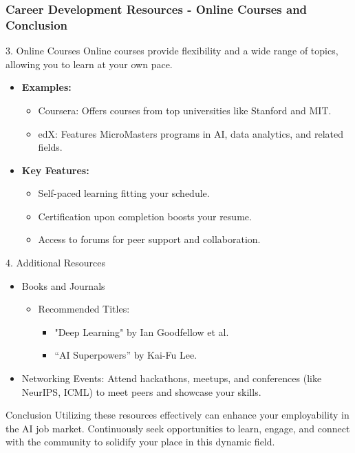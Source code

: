\documentclass{beamer}
\begin{document}
\begin{frame}[fragile]
    \frametitle{Career Development Resources - Online Courses and Conclusion}
    \begin{block}{3. Online Courses}
        Online courses provide flexibility and a wide range of topics, allowing you to learn at your own pace.
    \end{block}
    \begin{itemize}
        \item \textbf{Examples:}
        \begin{itemize}
            \item Coursera: Offers courses from top universities like Stanford and MIT.
            \item edX: Features MicroMasters programs in AI, data analytics, and related fields.
        \end{itemize}
        
        \item \textbf{Key Features:}
        \begin{itemize}
            \item Self-paced learning fitting your schedule.
            \item Certification upon completion boosts your resume.
            \item Access to forums for peer support and collaboration.
        \end{itemize}
    \end{itemize}
    
    \begin{block}{4. Additional Resources}
        \begin{itemize}
            \item Books and Journals
            \begin{itemize}
                \item Recommended Titles:
                \begin{itemize}
                    \item "Deep Learning" by Ian Goodfellow et al.
                    \item “AI Superpowers” by Kai-Fu Lee.
                \end{itemize}
            \end{itemize}
            \item Networking Events: Attend hackathons, meetups, and conferences (like NeurIPS, ICML) to meet peers and showcase your skills.
        \end{itemize}
    \end{block}
    
    \begin{block}{Conclusion}
        Utilizing these resources effectively can enhance your employability in the AI job market. Continuously seek opportunities to learn, engage, and connect with the community to solidify your place in this dynamic field.
    \end{block}
\end{frame}
\end{document}
